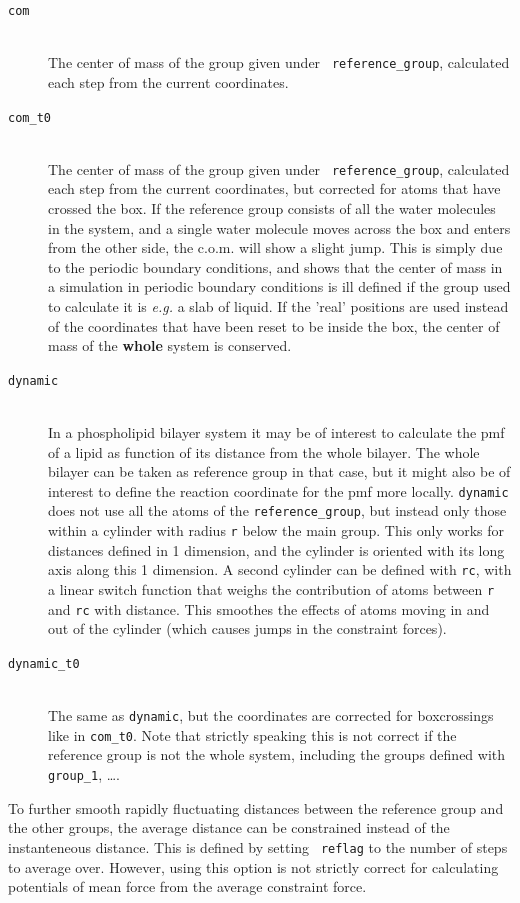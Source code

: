 \begin{description}
\item[\tt com]\mbox{}\\ The center of mass of the group given under {\tt
reference\_group}, calculated each step from the current coordinates. 
\item[\tt com\_t0]\mbox{}\\ The center of mass of the group given under {\tt
reference\_group}, calculated each step from the current coordinates,
but corrected for atoms that have crossed the box. If the reference
group consists of all the water molecules in the system, and a single
water molecule moves across the box and enters from the other side,
the c.o.m. will show a slight jump. This is simply due to the periodic
boundary conditions, and shows that the center of mass in a simulation
in periodic boundary conditions is ill defined if the group
used to calculate it is \emph{e.g.} a slab of liquid. If the 'real'
positions are used instead of the coordinates that have been reset to
be inside the box, the center of mass of the \textbf{whole} system is 
conserved. 
\item[\tt dynamic]\mbox{}\\ In a phospholipid bilayer system it may be of
interest to calculate the pmf of a lipid as function of its distance
from the whole bilayer. The whole bilayer can be taken as reference
group in that case, but it might also be of interest to define the
reaction coordinate for the pmf more locally. {\tt dynamic} does not
use all the atoms of the {\tt reference\_group}, but instead only those
within a cylinder with radius {\tt r} below the main group. This only
works for distances defined in 1 dimension, and the cylinder is
oriented with its long axis along this 1 dimension. A second cylinder
can be defined with {\tt rc}, with a linear switch function that weighs
the contribution of atoms between {\tt r} and {\tt rc} with
distance. This smoothes the effects of atoms moving in and out of the
cylinder (which causes jumps in the constraint forces). 
\item[\tt dynamic\_t0]\mbox{}\\
The same as {\tt dynamic}, but the coordinates are corrected for
boxcrossings like in {\tt com\_t0}. Note that strictly speaking this is
not correct if the reference group is not the whole system, including
the groups defined with {\tt group\_1}, \ldots.
\end{description}

To further smooth rapidly fluctuating distances between the reference
group and the other groups, the average distance can be constrained
instead of the instanteneous distance. This is defined by setting {\tt
reflag} to the number of steps to average over. However, using this
option is not strictly correct for calculating potentials of mean
force from the average constraint force. 

